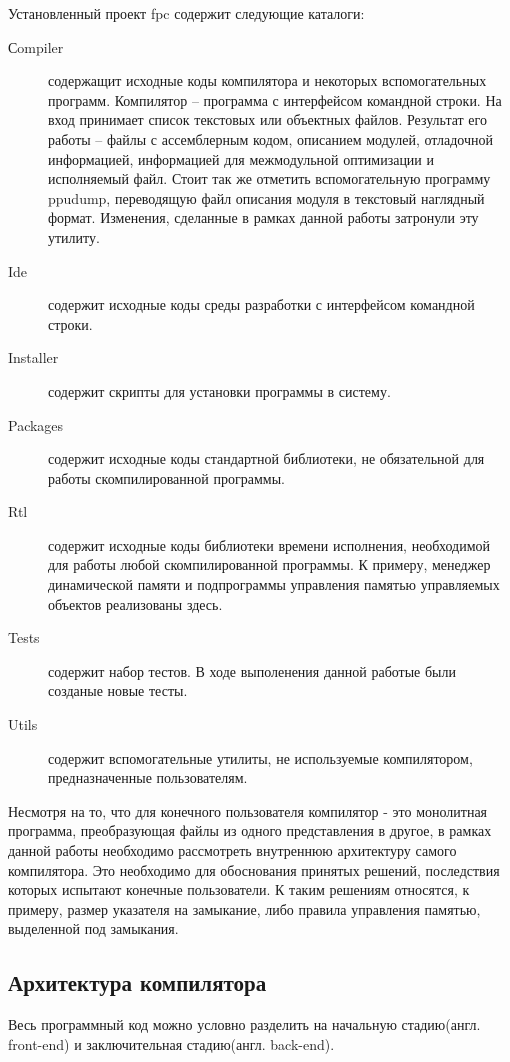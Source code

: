 \documentclass{imcs}
\begin{document}
Установленный проект fpc содержит следующие каталоги:
\begin{description}
  \item[Сompiler] содержащит исходные коды компилятора и некоторых 
  вспомогательных программ. Компилятор -- программа с интерфейсом командной строки. На вход
принимает список текстовых или объектных файлов. Результат его работы --
файлы с ассемблерным кодом, описанием модулей, отладочной информацией,
информацией для межмодульной оптимизации и исполняемый файл. Стоит так же отметить
вспомогательную программу ppudump, переводящую файл описания модуля в текстовый наглядный
формат. Изменения, сделанные в рамках данной работы затронули эту утилиту.
    \item[Ide] содержит исходные коды среды разработки с интерфейсом командной строки.
    \item[Installer] содержит скрипты для установки программы в систему.
    \item[Packages] содержит исходные коды стандартной библиотеки, не обязательной для работы скомпилированной программы.
    \item[Rtl] содержит исходные коды библиотеки времени исполнения, необходимой для работы любой скомпилированной программы. К 
примеру, менеджер динамической памяти и подпрограммы управления памятью
управляемых объектов реализованы здесь.
    \item[Tests] содержит набор тестов. В ходе выполенения данной работые были созданые
новые тесты.
    \item[Utils] содержит вспомогательные утилиты, не используемые компилятором,
предназначенные пользователям.
\end{description}

Несмотря на то, что для конечного пользователя компилятор - это монолитная
программа, преобразующая файлы из одного представления в другое, в рамках
данной работы необходимо рассмотреть внутреннюю архитектуру самого компилятора.
Это необходимо для обоснования принятых решений, последствия которых 
испытают конечные пользователи. К таким решениям относятся, к примеру,
размер указателя на замыкание, либо правила управления памятью,
выделенной под замыкания.

\subsection{Архитектура компилятора}

Весь программный код можно условно разделить на начальную стадию(англ. front-end)
и заключительная стадию(англ. back-end)\cite{dragonbook}.
\end{document}
